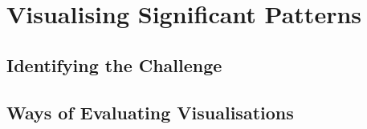 
\chapter{Visualising Significant Patterns}
\section{Identifying the Challenge}
\section{Ways of Evaluating Visualisations}
